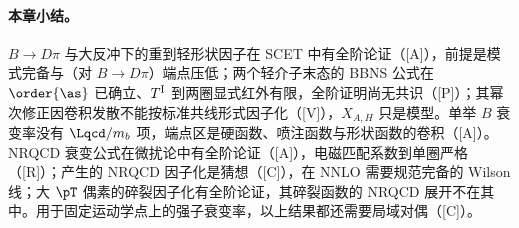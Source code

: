 \paragraph{本章小结。}
$B\to D\pi$ 与大反冲下的重到轻形状因子在 SCET 中有全阶论证（[A]），前提是模式完备与（对 $B\to D\pi$）端点压低；两个轻介子末态的 BBNS 公式在 $\order{\as}$ 已确立、$T^{\rm I}$ 到两圈显式红外有限，全阶证明尚无共识（[P]）；其幂次修正因卷积发散不能按标准共线形式因子化（[V]），$X_{A,H}$ 只是模型。单举 $B$ 衰变率没有 $\Lqcd/m_b$ 项，端点区是硬函数、喷注函数与形状函数的卷积（[A]）。NRQCD 衰变公式在微扰论中有全阶论证（[A]），电磁匹配系数到单圈严格（[R]）；产生的 NRQCD 因子化是猜想（[C]），在 NNLO 需要规范完备的 Wilson 线；大 $\pT$ 偶素的碎裂因子化有全阶论证，其碎裂函数的 NRQCD 展开不在其中。用于固定运动学点上的强子衰变率，以上结果都还需要局域对偶（[C]）。
